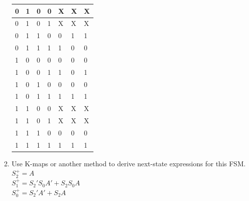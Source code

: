 \documentclass{article}
\begin{document}
\begin{enumerate}[label=\alph*.]
\begin{table}[!h]
\begin{tabular}{|l|l|l|l|l|l|l|}
0    & 1    & 0    & 0         & X                       & X                       & X                       \\ \hline
0    & 1    & 0    & 1         & X                       & X                       & X                       \\ \hline
0    & 1    & 1    & 0         & 0                       & 1                       & 1                       \\ \hline
0    & 1    & 1    & 1         & 1                       & 0                       & 0                       \\ \hline
1    & 0    & 0    & 0         & 0                       & 0                       & 0                       \\ \hline
1    & 0    & 0    & 1         & 1                       & 0                       & 1                       \\ \hline
1    & 0    & 1    & 0         & 0                       & 0                       & 0                       \\ \hline
1    & 0    & 1    & 1         & 1                       & 1                       & 1                       \\ \hline
1    & 1    & 0    & 0         & X                       & X                       & X                       \\ \hline
1    & 1    & 0    & 1         & X                       & X                       & X                       \\ \hline
1    & 1    & 1    & 0         & 0                       & 0                       & 0                       \\ \hline
1    & 1    & 1    & 1         & 1                       & 1                       & 1                       \\ \hline
\end{tabular}
\end{table}
\newpage

\item Use K-maps or another method to derive next-state expressions for this FSM. \\
\textbf{
$S_2^+ = A$\\
$S_1^+ = S_2'S_0A'+S_2S_0A$ \\
$S_0^+ = S_2'A' + S_2A$
}
\\ \\
\end{enumerate}
\end{document}
